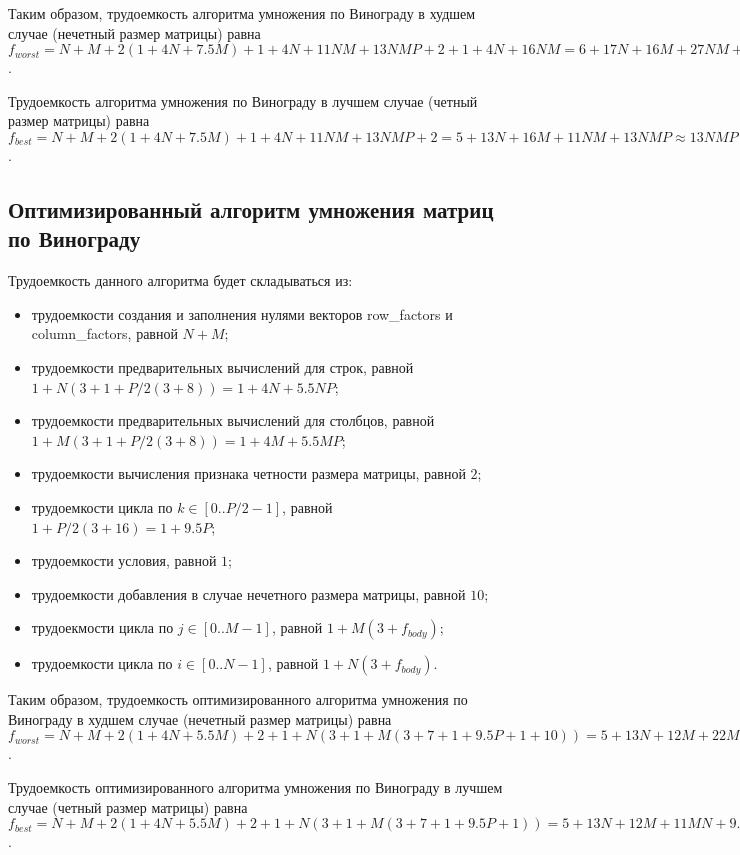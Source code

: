 Таким образом, трудоемкость алгоритма умножения по Винограду в худшем случае (нечетный размер матрицы) равна $f_{worst} = N + M + 2(1 + 4N + 7.5M) + 1 + 4N + 11NM + 13NMP + 2 + 1 + 4N + 16NM = 6 + 17N + 16M + 27NM + 13NMP \approx 13NMP$.

Трудоемкость алгоритма умножения по Винограду в лучшем случае (четный размер матрицы) равна $f_{best} = N + M + 2(1 + 4N + 7.5M) + 1 + 4N + 11NM + 13NMP + 2 = 5 + 13N + 16M + 11NM + 13NMP \approx 13NMP$.

\subsection{Оптимизированный алгоритм умножения матриц по Винограду}

Трудоемкость данного алгоритма будет складываться из:

\begin{itemize}
	\item трудоемкости создания и заполнения нулями векторов row\_factors и column\_factors, равной $N + M$;
	\item трудоемкости предварительных вычислений для строк, равной $1 + N(3 + 1 + P/2(3 + 8)) = 1 + 4N + 5.5NP$;
	\item трудоемкости предварительных вычислений для столбцов, равной $1 + M(3 + 1 + P/2(3 + 8)) = 1 + 4M + 5.5MP$;
	\item трудоемкости вычисления признака четности размера матрицы, равной $2$;
	\item трудоемкости цикла по $k \in [0..P/2-1]$, равной $1 + P/2(3 + 16) = 1 + 9.5P$;
	\item трудоемкости условия, равной $1$;
	\item трудоемкости добавления в случае нечетного размера матрицы, равной $10$;
	\item трудоекмости цикла по $j \in [0..M-1]$, равной $1 + M(3 + f_{body})$;
	\item трудоемкости цикла по $i \in [0..N-1]$, равной $1 + N(3 + f_{body})$.
\end{itemize}

Таким образом, трудоемкость оптимизированного алгоритма умножения по Винограду в худшем случае (нечетный размер матрицы) равна $f_{worst} = N + M + 2(1 + 4N + 5.5M) + 2 + 1 + N(3 + 1 + M(3 + 7 + 1 + 9.5P + 1 + 10)) = 5 + 13N + 12M + 22MN + 9.5MNP \approx 9.5NMP$.

Трудоемкость оптимизированного алгоритма умножения по Винограду в лучшем случае (четный размер матрицы) равна $f_{best} = N + M + 2(1 + 4N + 5.5M) + 2 + 1 + N(3 + 1 + M(3 + 7 + 1 + 9.5P + 1)) = 5 + 13N + 12M + 11MN + 9.5MNP \approx 9.5NMP$.


